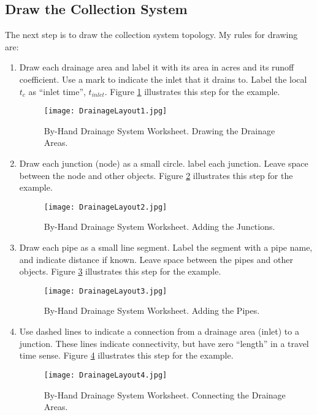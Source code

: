 \documentclass[12pt]{article}
\begin{document}
\subsection*{Draw the Collection System}
The next step is to draw the collection system topology.
My rules for drawing are:
\begin{enumerate}
\item Draw each drainage area and label it with its area in acres and its runoff coefficient.
Use a mark to indicate the inlet that it drains to.
Label the local $t_c$ as ``inlet time'', $t_{inlet}$.
Figure \ref{fig:DrainageLayout1} illustrates this step for the example.
\begin{figure}[ht!] %
\centering
   \texttt{[image: DrainageLayout1.jpg]}
   \caption{By-Hand Drainage System Worksheet.  Drawing the Drainage Areas.}
   \label{fig:DrainageLayout1} 
\end{figure}
\clearpage
\item Draw each junction (node) as a small circle.
label each junction.
Leave space between the node and other objects.
Figure \ref{fig:DrainageLayout2} illustrates this step for the example.
\begin{figure}[ht!] %
\centering
   \texttt{[image: DrainageLayout2.jpg]}
   \caption{By-Hand Drainage System Worksheet. Adding the Junctions.}
   \label{fig:DrainageLayout2} 
\end{figure}
\clearpage
\item Draw each pipe as a small line segment.
Label the segment with a pipe name, and indicate distance if known.
Leave space between the pipes and other objects.
Figure \ref{fig:DrainageLayout3} illustrates this step for the example.
\begin{figure}[ht!] %
\centering
   \texttt{[image: DrainageLayout3.jpg]}
   \caption{By-Hand Drainage System Worksheet. Adding the Pipes.}
   \label{fig:DrainageLayout3} 
\end{figure}
\clearpage
\item Use dashed lines to indicate a connection from a drainage area (inlet) to a junction.
These lines indicate connectivity, but have zero ``length'' in a travel time sense.
Figure \ref{fig:DrainageLayout4} illustrates this step for the example.
\begin{figure}[ht!] %
\centering
   \texttt{[image: DrainageLayout4.jpg]}
   \caption{By-Hand Drainage System Worksheet. Connecting the Drainage Areas.}
   \label{fig:DrainageLayout4} 
\end{figure}
\end{enumerate}
\end{document}
